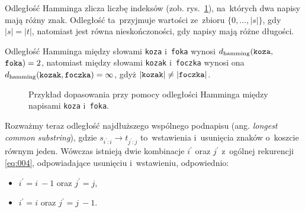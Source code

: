 \documentclass{praca1}
\begin{document}
Odległość Hamminga zlicza liczbę indeksów (zob. rys.~\ref{rys:002}), na~których dwa napisy mają różny znak. Odległość ta~przyjmuje wartości ze~zbioru $\{0,\ldots,|s|\}$, gdy $|s|=|t|$, natomiast jest równa nieskończoności, gdy napisy mają różne długości.

\begin{example}
Odległość Hamminga między słowami \verb|koza| i~\verb|foka| wynosi $d_{\mathrm{hamming}}(\verb|koza|,$ $\verb|foka|) = 2$, natomiast między słowami \verb|kozak| i~\verb|foczka| wynosi ona $d_{\mathrm{hamming}}(\verb|kozak|, \verb|foczka|) = \infty$, gdyż $|\verb|kozak| | \neq | \verb|foczka| |$.
\end{example}

\begin{figure}[width=80pt]
\centering
{}
\cprotect\caption{Przykład dopasowania przy pomocy odległości Hamminga między napisami \verb|koza| i~\verb|foka|.}\label{rys:002}
\end{figure}



Rozważmy teraz odległość najdłuższego wspólnego podnapisu (ang. \emph{longest common substring}), gdzie $s_{i^\prime:i}\rightarrow t_{j^\prime:j}$ to~wstawienia i~usunięcia znaków o~koszcie równym jeden. Wówczas istnieją dwie kombinacje $i^\prime$ oraz $j^\prime$ z~ogólnej rekurencji \eqref{eq:004}, odpowiadające usunięciu i~wstawieniu, odpowiednio:
\begin{itemize}
\item $i^\prime = i~- 1$ oraz $j^\prime = j$,
\item $i^\prime = i$ oraz $j^\prime = j~- 1$.
\end{itemize}
\end{document}
